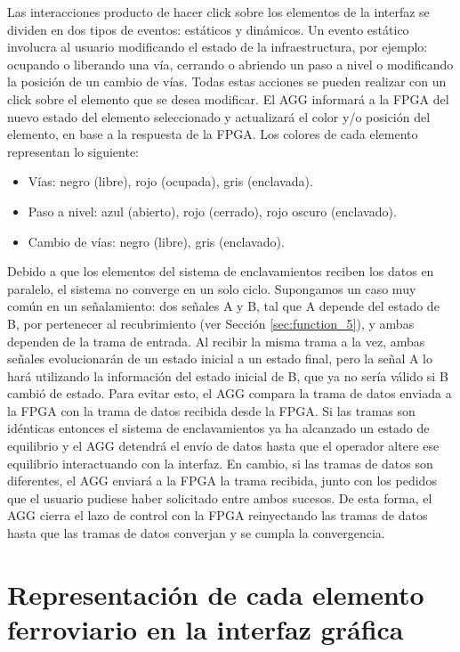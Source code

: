 	Las interacciones producto de hacer click sobre los elementos de la interfaz se dividen en dos tipos de eventos: estáticos y dinámicos. Un evento estático involucra al usuario modificando el estado de la infraestructura, por ejemplo: ocupando o liberando una vía, cerrando o abriendo un paso a nivel o modificando la posición de un cambio de vías. Todas estas acciones se pueden realizar con un click sobre el elemento que se desea modificar. El AGG informará a la FPGA del nuevo estado del elemento seleccionado y actualizará el color y/o posición del elemento, en base a la respuesta de la FPGA. Los colores de cada elemento representan lo siguiente:
		
	\begin{itemize}
		\item Vías: negro (libre), rojo (ocupada), gris (enclavada).
		\item Paso a nivel: azul (abierto), rojo (cerrado), rojo oscuro (enclavado).
		\item Cambio de vías: negro (libre), gris (enclavado).
	\end{itemize}
	
	Debido a que los elementos del sistema de enclavamientos reciben los datos en paralelo, el sistema no converge en un solo ciclo. Supongamos un caso muy común en un señalamiento: dos señales A y B, tal que A depende del estado de B, por pertenecer al recubrimiento (ver Sección \ref{sec:function_5}), y ambas dependen de la trama de entrada. Al recibir la misma trama a la vez, ambas señales evolucionarán de un estado inicial a un estado final, pero la señal A lo hará utilizando la información del estado inicial de B, que ya no sería válido si B cambió de estado. Para evitar esto, el AGG compara la trama de datos enviada a la FPGA con la trama de datos recibida desde la FPGA. Si las tramas son idénticas entonces el sistema de enclavamientos ya ha alcanzado un estado de equilibrio y el AGG detendrá el envío de datos hasta que el operador altere ese equilibrio interactuando con la interfaz. En cambio, si las tramas de datos son diferentes, el AGG enviará a la FPGA la trama recibida, junto con los pedidos que el usuario pudiese haber solicitado entre ambos sucesos. De esta forma, el AGG cierra el lazo de control con la FPGA reinyectando las tramas de datos hasta que las tramas de datos converjan y se cumpla la convergencia.

	\section{Representación de cada elemento ferroviario en la interfaz gráfica}
	\label{sec:AGG_STATUS}
	
